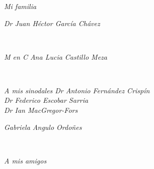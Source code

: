 \documentclass[compress]{beamer}
\begin{document}
{

\begin{frame}
\frametitle{}
\begin{itemize}
\small{\item \textit{Mi familia}}
\pause
\small{\item \textit{Dr Juan Héctor García Chávez}}\\
\pause
\small{\item \textit{M en C Ana Lucia Castillo Meza}}\\
\pause
\small{\item \textit{A mis sinodales Dr Antonio Fernández Crispín\\
Dr Federico Escobar Sarria\\
Dr Ian MacGregor-Fors}}
\pause
\small{\item \textit{Gabriela Angulo Ordoñes}}\\
\pause
\small{\item \textit{A mis amigos}}\\


\end{itemize}

\end{frame}
}
{
{

\begin{frame}
\frametitle{}

\end{frame}
}
}
\end{document}
